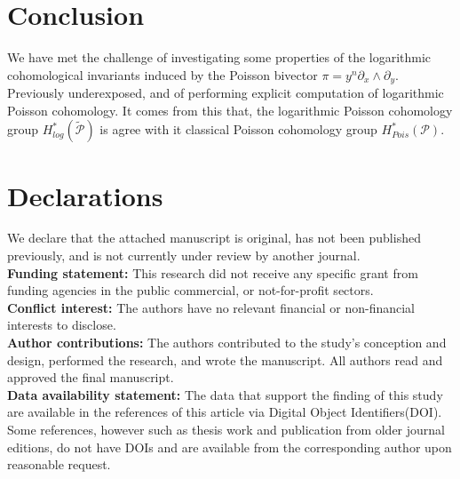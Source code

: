 \documentclass[a4paper, 12pt,oneside,reqno]{amsart}
\theoremstyle{definition}
\begin{document}
 \section{Conclusion}
We have met the  challenge of investigating some properties of the logarithmic cohomological invariants induced by
the Poisson bivector $\pi = y^n\partial_{x}\wedge \partial_{y}$. Previously underexposed, and of performing
explicit computation of logarithmic Poisson cohomology. It comes from this that, the logarithmic Poisson cohomology group $H_{log}^{*}(\tilde{\mathcal{P}})$ is
 agree with it classical Poisson cohomology group $H_{Pois}^{*}(\mathcal{P})$.

\section*{Declarations}
 We declare that the attached manuscript is original, has not been published previously, and is not currently under review by another journal.\\
 
\textbf{ Funding statement:} This research did not receive any specific grant from funding agencies in the public commercial, or not-for-profit sectors.\\

 \textbf{Conflict interest:} The authors have no relevant financial or non-financial interests to disclose.\\
 
\textbf{Author contributions: } The authors contributed to the study's conception and design, performed the research, and wrote the manuscript. All authors read and approved the final manuscript.\\

\textbf{Data availability statement:} The data that support the finding of this study are available in the references of this article via Digital Object Identifiers(DOI). Some references, however such as thesis work and publication from  older journal editions, do not have DOIs and are available from the corresponding author upon reasonable request.\\


\end{document}
